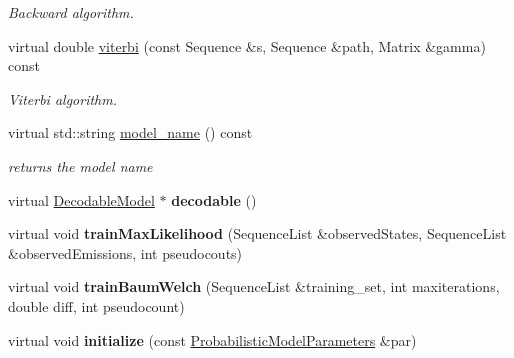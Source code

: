\begin{DoxyCompactItemize}
\begin{DoxyCompactList}\small\item\em Backward algorithm. \end{DoxyCompactList}\item 
\mbox{\label{classtops_1_1ProfileHiddenMarkovModel_adb01e330a3a65f1dfb36805c715bad0e}} 
virtual double \hyperlink{classtops_1_1ProfileHiddenMarkovModel_adb01e330a3a65f1dfb36805c715bad0e}{viterbi} (const Sequence \&s, Sequence \&path, Matrix \&gamma) const
\begin{DoxyCompactList}\small\item\em Viterbi algorithm. \end{DoxyCompactList}\item 
\mbox{\label{classtops_1_1ProfileHiddenMarkovModel_a60ea68753cf8afd02a371f3f06bb39d8}} 
virtual std\+::string \hyperlink{classtops_1_1ProfileHiddenMarkovModel_a60ea68753cf8afd02a371f3f06bb39d8}{model\+\_\+name} () const
\begin{DoxyCompactList}\small\item\em returns the model name \end{DoxyCompactList}\item 
\mbox{\label{classtops_1_1ProfileHiddenMarkovModel_a971dc5f7a196a5ae6b509739447ca4c8}} 
virtual \hyperlink{classtops_1_1DecodableModel}{Decodable\+Model} $\ast$ {\bfseries decodable} ()
\item 
\mbox{\label{classtops_1_1ProfileHiddenMarkovModel_aadb05a58ba63c3256efe6564d9c8c267}} 
virtual void {\bfseries train\+Max\+Likelihood} (Sequence\+List \&observed\+States, Sequence\+List \&observed\+Emissions, int pseudocouts)
\item 
\mbox{\label{classtops_1_1ProfileHiddenMarkovModel_a44e7c36ae180f69356aa90530229b890}} 
virtual void {\bfseries train\+Baum\+Welch} (Sequence\+List \&training\+\_\+set, int maxiterations, double diff, int pseudocount)
\item 
\mbox{\label{classtops_1_1ProfileHiddenMarkovModel_a3bf0555e30628cb91cf7fdee16817ed1}} 
virtual void {\bfseries initialize} (const \hyperlink{classtops_1_1ProbabilisticModelParameters}{Probabilistic\+Model\+Parameters} \&par)

\end{DoxyCompactItemize}
